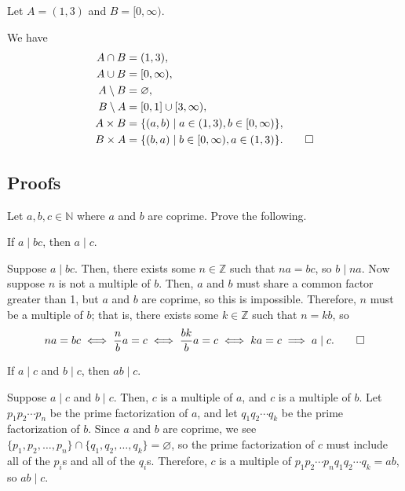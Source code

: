\begin{exer}
Let $ A=(1,3) $ and $ B=[0,\infty ) $.
\end{exer}
\begin{sltn}
We have
\begin{align*}
    A\cap B &= (1,3), \\
    A\cup B &= [0,\infty ), \\
    A\setminus B &= \varnothing, \\
    B\setminus A &= [0,1]\cup [3,\infty ), \\
    A\times B &= \{(a,b)\mid a\in(1,3),b\in [0,\infty )\}, \\
    B\times A &= \{(b,a)\mid b\in [0,\infty ),a\in (1,3)\}.\qedhere
\end{align*}
\end{sltn}

\subsection*{Proofs}

Let $ a,b,c\in\mathbb{N} $ where $ a $ and $ b $ are coprime. Prove the following.

\begin{exer}
If $ a\mid bc $, then $ a\mid c $.
\end{exer}
\begin{sltn}
Suppose $ a\mid bc $. Then, there exists some $ n\in\mathbb{Z} $ such that $ na=bc $, so $ b\mid na $. Now suppose $ n $ is not a multiple of $ b $. Then, $ a $ and $ b $ must share a common factor greater than 1, but $ a $ and $ b $ are coprime, so this is impossible. Therefore, $ n $ must be a multiple of $ b $; that is, there exists some $ k\in\mathbb{Z} $ such that $ n=kb $, so
\begin{equation*}
    na=bc \iff \frac{n}{b}a=c \iff \frac{bk}{b}a=c \iff ka=c \implies a\mid c.\qedhere
\end{equation*}
\end{sltn}

\begin{exer}
If $ a\mid c $ and $ b\mid c $, then $ ab\mid c $.
\end{exer}
\begin{sltn}
Suppose $ a\mid c $ and $ b\mid c $. Then, $ c $ is a multiple of $ a $, and $ c $ is a multiple of $ b $. Let $ p_1p_2\cdots p_n $ be the prime factorization of $ a $, and let $ q_1q_2\cdots q_k $ be the prime factorization of $ b $. Since $ a $ and $ b $ are coprime, we see $ \{p_1,p_2,\ldots,p_n\}\cap\{q_1,q_2,\ldots,q_k\}=\varnothing $, so the prime factorization of $ c $ must include all of the $ p_i $s and all of the $ q_i $s. Therefore, $ c $ is a multiple of $ p_1p_2\cdots p_nq_1q_2\cdots q_k=ab $, so $ ab\mid c $.
\end{sltn}